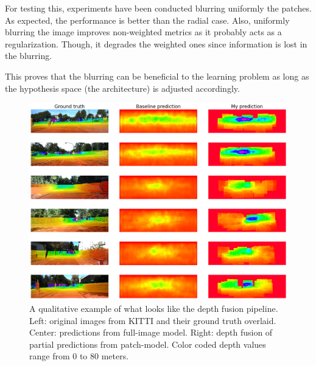 For testing this, experiments have been conducted blurring uniformly the patches.
As expected, the performance is better than the radial case.
Also, uniformly blurring the image improves non-weighted metrics as it probably acts as a regularization.
Though, it degrades the weighted ones since information is lost in the blurring.

This proves that the blurring can be beneficial to the learning problem as long as the hypothesis space (the architecture) is adjusted accordingly.
\begin{figure}
    \begin{adjustwidth}{-0.2\textwidth}{-0.2\textwidth}
    \centering
    \includegraphics[width=1.4\textwidth]{figs/full_fusion}
    \end{adjustwidth}
    \caption{
        A qualitative example of what looks like the depth fusion pipeline.
        Left: original images from KITTI and their ground truth overlaid.
        Center: predictions from full-image model.
        Right: depth fusion of partial predictions from patch-model.
        Color coded depth values range from 0 to 80 meters.
        \label{fig:fusion}
    }
\end{figure}

